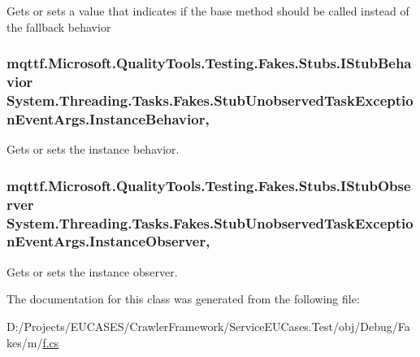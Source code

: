 Gets or sets a value that indicates if the base method should be called instead of the fallback behavior

\hypertarget{class_system_1_1_threading_1_1_tasks_1_1_fakes_1_1_stub_unobserved_task_exception_event_args_adc50950780e15a3cc9084c92fc7c65b1}{
\subsubsection[{Instance\-Behavior}]{\setlength{\rightskip}{0pt plus 5cm}mqttf.\-Microsoft.\-Quality\-Tools.\-Testing.\-Fakes.\-Stubs.\-I\-Stub\-Behavior System.\-Threading.\-Tasks.\-Fakes.\-Stub\-Unobserved\-Task\-Exception\-Event\-Args.\-Instance\-Behavior\hspace{0.3cm}{\ttfamily [get]}, {\ttfamily [set]}}}\label{class_system_1_1_threading_1_1_tasks_1_1_fakes_1_1_stub_unobserved_task_exception_event_args_adc50950780e15a3cc9084c92fc7c65b1}


Gets or sets the instance behavior.

\hypertarget{class_system_1_1_threading_1_1_tasks_1_1_fakes_1_1_stub_unobserved_task_exception_event_args_ad68485711e2845b01a75443ba1551c6e}{
\subsubsection[{Instance\-Observer}]{\setlength{\rightskip}{0pt plus 5cm}mqttf.\-Microsoft.\-Quality\-Tools.\-Testing.\-Fakes.\-Stubs.\-I\-Stub\-Observer System.\-Threading.\-Tasks.\-Fakes.\-Stub\-Unobserved\-Task\-Exception\-Event\-Args.\-Instance\-Observer\hspace{0.3cm}{\ttfamily [get]}, {\ttfamily [set]}}}\label{class_system_1_1_threading_1_1_tasks_1_1_fakes_1_1_stub_unobserved_task_exception_event_args_ad68485711e2845b01a75443ba1551c6e}


Gets or sets the instance observer.



The documentation for this class was generated from the following file\-:\begin{DoxyCompactItemize}
\item 
D\-:/\-Projects/\-E\-U\-C\-A\-S\-E\-S/\-Crawler\-Framework/\-Service\-E\-U\-Cases.\-Test/obj/\-Debug/\-Fakes/m/\hyperlink{m_2f_8cs}{f.\-cs}\end{DoxyCompactItemize}
